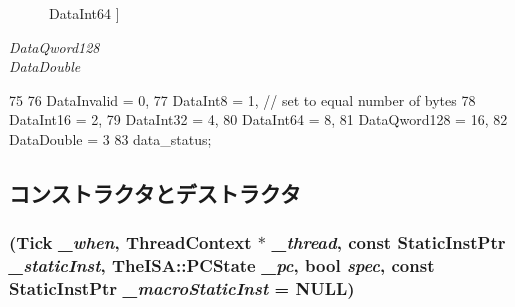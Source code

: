 \begin{Desc}
\begin{description}
{\hypertarget{classTrace_1_1InstRecord_abe974f22edeef8189603ba75fd90ff3ca2bc61b9bf4d308895d6e9ca4599ea59f}{
DataInt64}
\label{classTrace_1_1InstRecord_abe974f22edeef8189603ba75fd90ff3ca2bc61b9bf4d308895d6e9ca4599ea59f}
}]\item[{\em 
\hypertarget{classTrace_1_1InstRecord_abe974f22edeef8189603ba75fd90ff3ca637bf6e6d7ba7b96c66bdeb3ffe53795}{
DataQword128}
\label{classTrace_1_1InstRecord_abe974f22edeef8189603ba75fd90ff3ca637bf6e6d7ba7b96c66bdeb3ffe53795}
}]\item[{\em 
\hypertarget{classTrace_1_1InstRecord_abe974f22edeef8189603ba75fd90ff3ca6e3a5b8477fbcecbbfc303d377bc41da}{
DataDouble}
\label{classTrace_1_1InstRecord_abe974f22edeef8189603ba75fd90ff3ca6e3a5b8477fbcecbbfc303d377bc41da}
}]\end{description}
\end{Desc}




\begin{DoxyCode}
75          {
76         DataInvalid = 0,
77         DataInt8 = 1,   // set to equal number of bytes
78         DataInt16 = 2,
79         DataInt32 = 4,
80         DataInt64 = 8,
81         DataQword128 = 16,
82         DataDouble = 3
83     } data_status;
\end{DoxyCode}


\subsection{コンストラクタとデストラクタ}
\hypertarget{classTrace_1_1InstRecord_a700779baa07a708524e5742e47eca986}{
\subsubsection[{InstRecord}]{ ({\bf Tick} {\em \_\-when}, \/  {\bf ThreadContext} $\ast$ {\em \_\-thread}, \/  const {\bf StaticInstPtr} {\em \_\-staticInst}, \/  TheISA::PCState {\em \_\-pc}, \/  bool {\em spec}, \/  const {\bf StaticInstPtr} {\em \_\-macroStaticInst} = {\ttfamily NULL})}}
\label{classTrace_1_1InstRecord_a700779baa07a708524e5742e47eca986}



